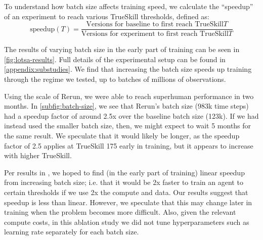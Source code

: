 \documentclass[11pt]{article}
\newcommand{\cleanexpname}{Rerun\xspace}
\newcommand{\trueskillname}{TrueSkill\xspace}
\begin{document}
To understand how batch size affects training speed, we calculate the ``speedup'' of an experiment to reach various \trueskillname thresholds, defined as:
\begin{equation}\label{eqn:speedup}
    \textrm{speedup}(T) = \frac
    {\textrm{Versions for baseline to first reach \trueskillname $T$}}
    {\textrm{Versions for experiment to first reach \trueskillname $T$}}
\end{equation}

The results of varying batch size %
in the early part of training can be seen in \autoref{fig:lotsa-results}.
Full details of the experimental setup can be found in \autoref{appendix:substudies}. 
We find that increasing the batch size speeds up training through the regime we tested, up to batches of millions of observations.

Using the scale of \cleanexpname, we were able to reach superhuman performance in two months. 
In \autoref{subfig:batch-size}, we see that \cleanexpname's batch size (983k time steps) had a speedup factor of around 2.5x over the baseline batch size (123k). If we had instead used the smaller batch size, then, we might expect to wait 5 months for the same result. 
We speculate that it would likely be longer, as the speedup factor of 2.5 applies at \trueskillname 175 early in training, but it appears to increase with higher \trueskillname. 

Per results in \cite{mccandlish2018empirical}, we hoped to find (in the early part of training) linear
speedup from increasing batch size; i.e. that it would be 2x faster to train an agent to certain thresholds if we use 2x the compute and data.
Our results suggest that speedup is less than linear.
However, we speculate that this may change later in training when the problem becomes more difficult. %
Also, given the relevant compute costs, in this ablation study we did not tune hyperparameters such as learning rate separately for each batch size.

\end{document}
